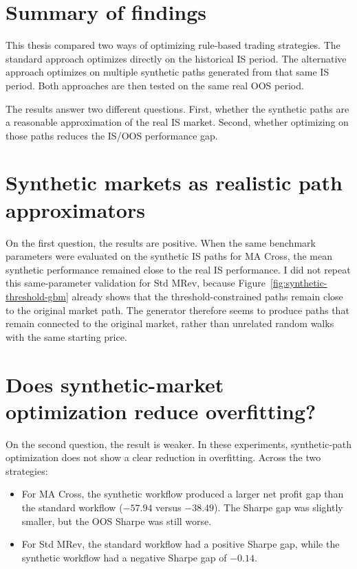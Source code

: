 \section{Summary of findings}

This thesis compared two ways of optimizing rule-based trading strategies. The standard approach
optimizes directly on the historical IS period. The alternative approach optimizes on multiple
synthetic paths generated from that same IS period. Both approaches are then tested on the same real OOS
period.

The results answer two different questions. First, whether the synthetic paths are a reasonable
approximation of the real IS market. Second, whether optimizing on those paths reduces the IS/OOS
performance gap.

\section{Synthetic markets as realistic path approximators}

On the first question, the results are positive. When the same benchmark parameters were evaluated on
the synthetic IS paths for MA Cross, the mean synthetic performance remained close to the real IS
performance. I did not repeat this same-parameter validation for Std MRev, because
Figure~\ref{fig:synthetic-threshold-gbm} already shows that the threshold-constrained paths remain close
to the original market path. The generator therefore seems to produce paths that remain connected to
the original market, rather than unrelated random walks with the same starting price.

\section{Does synthetic-market optimization reduce overfitting?}

On the second question, the result is weaker. In these experiments, synthetic-path optimization does not
show a clear reduction in overfitting. Across the two strategies:

\begin{itemize}
    \item For MA Cross, the synthetic workflow produced a larger net profit gap than the standard
    workflow (\(-57.94\) versus \(-38.49\)). The Sharpe gap was slightly smaller, but the OOS Sharpe was
    still worse.
    \item For Std MRev, the standard workflow had a positive Sharpe gap, while the synthetic workflow
    had a negative Sharpe gap of \(-0.14\).
\end{itemize}

